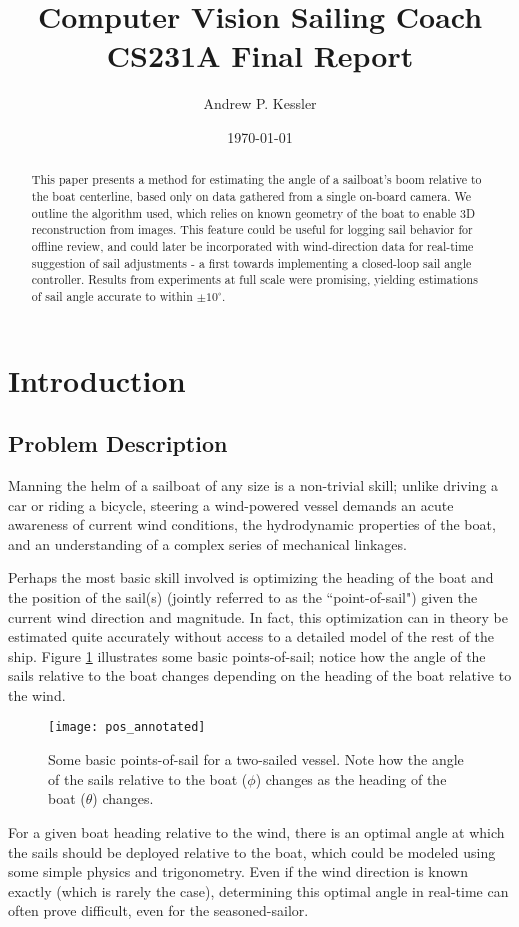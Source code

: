 \documentclass[letterpaper, 10 pt, conference]{ieeeconf}  %
\title{ {\bf Computer Vision Sailing Coach} \\ CS231A Final Report}
\author{Andrew P. Kessler}
\date{\today}
\begin{document}
\maketitle


\begin{abstract}


This paper presents a method for estimating the angle of a sailboat's boom relative to the boat centerline, based only on data gathered from a single on-board camera.  We outline the algorithm used, which relies on known geometry of the boat to enable 3D reconstruction from images. This feature could be useful for logging sail behavior for offline review, and could later be incorporated with wind-direction data for real-time suggestion of sail adjustments - a first towards implementing a closed-loop sail angle controller. Results from experiments at full scale were promising, yielding estimations of sail angle accurate to within $\pm 10 ^\circ$. 
\end{abstract}

\section{Introduction}
\subsection{Problem Description}
Manning the helm of a sailboat of any size is a non-trivial skill; unlike driving a car or riding a bicycle, steering a wind-powered vessel demands an acute awareness of current wind conditions, the hydrodynamic properties of the boat, and an understanding of a complex series of mechanical linkages. 

Perhaps the most basic skill involved is optimizing the heading of the boat and the position of the sail(s) (jointly referred to as the ``point-of-sail") given the current wind direction and magnitude. In fact, this optimization can in theory be estimated quite accurately without access to a detailed model of the rest of the ship. Figure \ref{fig:pos} illustrates some basic points-of-sail; notice how the angle of the sails relative to the boat changes depending on the heading of the boat relative to the wind. 

\begin{figure}[htbp]
   \centering
   \texttt{[image: pos\_annotated]} %
   \caption{Some basic points-of-sail for a two-sailed vessel. Note how the angle of the sails relative to the boat ($\phi$) changes as the heading of the boat ($\theta$) changes. }
   \label{fig:pos}
\end{figure}
For a given boat heading relative to the wind, there is an optimal angle at which the sails should be deployed relative to the boat, which could be modeled using some simple physics and trigonometry. Even if the wind direction is known exactly (which is rarely the case), determining this optimal angle in real-time can often prove difficult, even for the seasoned-sailor.
\end{document}
